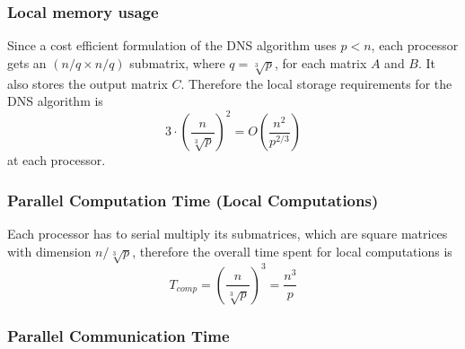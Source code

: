 \documentclass{article}
\begin{document}
\subsubsection{Local memory usage}

Since a cost efficient formulation of the DNS algorithm uses $p < n$, each
processor gets an $(n/q \times n/q)$ submatrix, where $q = \sqrt[3]{p}$, for
each matrix $A$ and $B$.  It also stores the output matrix $C$.  Therefore the
local storage requirements for the DNS algorithm is $$3 \cdot {\left(\frac{n}{\sqrt[3]{p}}\right)}^2 = O\left(\frac{n^2}{p^{2/3}}\right)$$ at each
processor.

\subsubsection{Parallel Computation Time (Local Computations)}

Each processor has to serial multiply its submatrices, which are square matrices with dimension $ n/\sqrt[3]{p}$, therefore the
overall time spent for local computations is 
$$T_{{comp}} = \left(\frac{n}{\sqrt[3]{p}}\right)^3 = \frac{n^3}{p}$$

\subsubsection{Parallel Communication Time}
\end{document}
